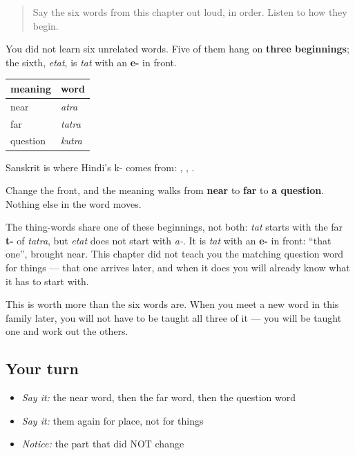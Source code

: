 \label{lesson:SA-C14-deixis-system}



\begin{quote}
Say the six words from this chapter out loud, in order. Listen to how they begin.
\end{quote}

\begin{grammarlens}[title={Grammar lens: one slot changes}]
You did not learn six unrelated words. Five of them hang on \textbf{three beginnings}; the sixth, \emph{etat}, is \emph{tat} with an \textbf{e-} in front.

\noindent
\begin{tabularx}{\linewidth}{@{}>{\raggedright\arraybackslash}X>{\raggedright\arraybackslash}X@{}}
\toprule
\textbf{meaning} & \textbf{word} \\
\midrule
near & \textbf{\sk{अत्र}} \emph{atra} \\
far & \textbf{\sk{तत्र}} \emph{tatra} \\
question & \textbf{\sk{कुत्र}} \emph{kutra} \\
\bottomrule
\end{tabularx}

Sanskrit is where Hindi's k- comes from: , , .

Change the front, and the meaning walks from \textbf{near} to \textbf{far} to \textbf{a question}. Nothing else in the word moves.

The thing-words share one of these beginnings, not both: \textbf{} \emph{tat} starts with the far \textbf{t-} of \emph{tatra}, but \textbf{} \emph{etat} does not start with \emph{a-}. It is \emph{tat} with an \textbf{e-} in front: \textquotedblleft{}that one\textquotedblright{}, brought near. This chapter did not teach you the matching question word for things — that one arrives later, and when it does you will already know what it has to start with.

This is worth more than the six words are. When you meet a new word in this family later, you will not have to be taught all three of it — you will be taught one and work out the others.
\end{grammarlens}

\subsection*{Your turn}
\begin{itemize}
\raggedright
  \item \emph{Say it:} the near word, then the far word, then the question word
  \item \emph{Say it:} them again for place, not for things
  \item \emph{Notice:} the part that did NOT change
\end{itemize}

